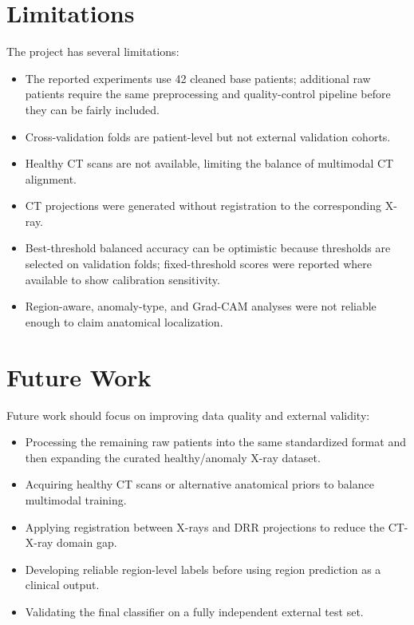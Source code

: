 \section{Limitations}
The project has several limitations:
\begin{itemize}
    \item The reported experiments use 42 cleaned base patients; additional raw patients require the same preprocessing and quality-control pipeline before they can be fairly included.
    \item Cross-validation folds are patient-level but not external validation cohorts.
    \item Healthy CT scans are not available, limiting the balance of multimodal CT alignment.
    \item CT projections were generated without registration to the corresponding X-ray.
    \item Best-threshold balanced accuracy can be optimistic because thresholds are selected on validation folds; fixed-threshold scores were reported where available to show calibration sensitivity.
    \item Region-aware, anomaly-type, and Grad-CAM analyses were not reliable enough to claim anatomical localization.
\end{itemize}

\section{Future Work}
Future work should focus on improving data quality and external validity:
\begin{itemize}
    \item Processing the remaining raw patients into the same standardized format and then expanding the curated healthy/anomaly X-ray dataset.
    \item Acquiring healthy CT scans or alternative anatomical priors to balance multimodal training.
    \item Applying registration between X-rays and DRR projections to reduce the CT-X-ray domain gap.
    \item Developing reliable region-level labels before using region prediction as a clinical output.
    \item Validating the final classifier on a fully independent external test set.
\end{itemize}
